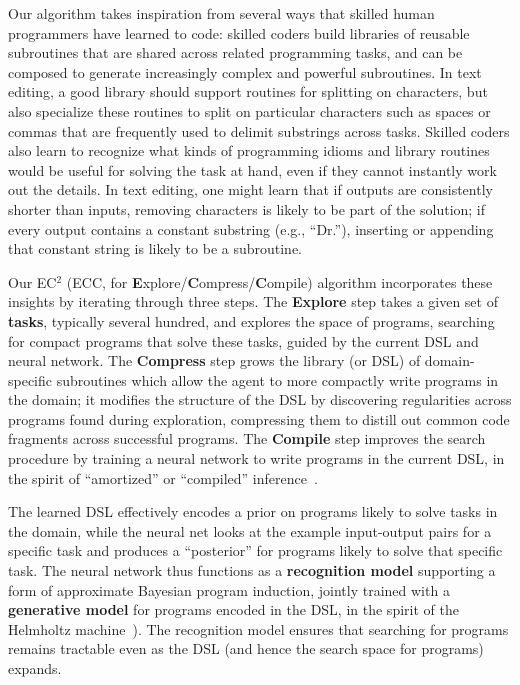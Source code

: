\documentclass{article}
\newcommand{\system}{\textsc{EC$^2$} }
\begin{document}
Our algorithm takes inspiration from several ways that skilled human
programmers have learned to code: skilled coders build libraries of
reusable subroutines that are shared across related programming tasks,
and can be composed to generate increasingly complex and powerful
subroutines.  In text editing, a good library should support routines
for splitting on characters, but also specialize these routines to
split on particular characters such as spaces or commas that are
frequently used to delimit substrings across tasks.  Skilled coders
also learn to recognize what kinds of programming idioms and library
routines would be useful for solving the task at hand, even if they
cannot instantly work out the details.  In text editing, one might
learn that if outputs are consistently shorter than inputs, removing
characters is likely to be part of the solution; if every output
contains a constant substring (e.g., ``Dr.''), inserting or appending
that constant string is likely to be a subroutine.

Our \system (ECC, for \textbf{E}xplore/\textbf{C}ompress/\textbf{C}ompile)
algorithm incorporates these insights by iterating through three steps. 
The \textbf{Explore} step takes a given set of \textbf{tasks}, typically
several hundred, and explores the space of programs, searching for compact programs that solve these tasks,
guided by the current DSL and neural network.
The \textbf{Compress} step grows the library (or DSL) of
domain-specific subroutines which allow the agent to more compactly
write programs in the domain; it modifies the structure of the DSL by
discovering regularities across programs found during exploration, compressing
them to distill out common code fragments across successful programs.
The \textbf{Compile} step improves the search procedure by training a neural network to
write programs in the current DSL, in the spirit of ``amortized'' or
``compiled'' inference~\cite{le2016inference,stuhlmuller2013learning}.%

The learned DSL effectively encodes a prior on programs likely to
solve tasks in the domain, while the neural net looks at the example
input-output pairs for a specific task and produces a ``posterior''
for programs likely to solve that specific task.  The neural network
thus functions as a \textbf{recognition model} supporting a form of
approximate Bayesian program induction, jointly trained with a
\textbf{generative model} for programs encoded in the DSL, in the
spirit of the Helmholtz machine~\cite{hinton1995wake}). The
recognition model ensures that searching for programs remains
tractable even as the DSL (and hence the search space for programs)
expands.
\end{document}
